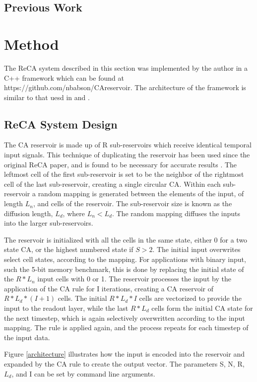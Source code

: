 \documentclass{article}
\begin{document}
\begin{multicols}{2}
\subsection{Previous Work}

\section{Method}\label{method}
The ReCA system described in this section was implemented by the author in a 
C++ framework which can be found at https://github.com/nbabson/CAreservoir. The 
architecture of the framework is similar to that uesd in  
\cite{nichele2017deep} and \cite{bye2016investigation}.

\subsection{ReCA System Design}
The CA reservoir is made up of R sub-reservoirs which receive identical 
temporal input signals. This technique of duplicating the reservoir has been 
used since the original ReCA paper, and is found to be necessary for accurate 
results \cite{yilmaz2014reservoir}.
The leftmost cell of the first sub-reservoir is set to be the 
neighbor of the rightmost cell of the last sub-reservoir, creating a single 
circular CA.  Within each sub-reservoir a random mapping is generated between 
the elements of the input, of length $L_{n}$, and cells of the reservoir. The 
sub-reservoir size is known as the diffusion length, $L_{d}$, where $L_{n} < 
L_{d}$. The random mapping diffuses the inputs into the larger sub-reservoirs.  
\par The reservoir is initialized with all the cells in the same state, either 
0 for a two state CA, or the highest numbered state if $S > 2$. The initial 
input overwrites select cell states, according to the mapping. For applications 
with binary input, such the 5-bit memory benchmark, this is done by replacing 
the initial state of the $R * L_{n}$ input cells with 0 or 1.  The reservoir 
processes the input by the application of the CA rule for I iterations, 
          creating a CA reservoir of $R * L_{d} * (I + 1)$ cells. The initial 
          $R * L_{d} * I$ cells are vectorized to provide the input to the 
          readout layer, while the last $R * L_{d}$ cells form the initial CA 
          state for the next timestep, which is again selectively overwritten 
          according to the input mapping. The rule is applied again, and the 
          process repeats for each timestep of the input data.  \par  Figure 
          \ref{architecture} illustrates how the input is encoded into the 
          reservoir and expanded by the CA rule to create the output vector.  
          The parameters S, N, R, $L_{d}$, and I can be set by command line 
          arguments.


\end{multicols}
\end{document}
